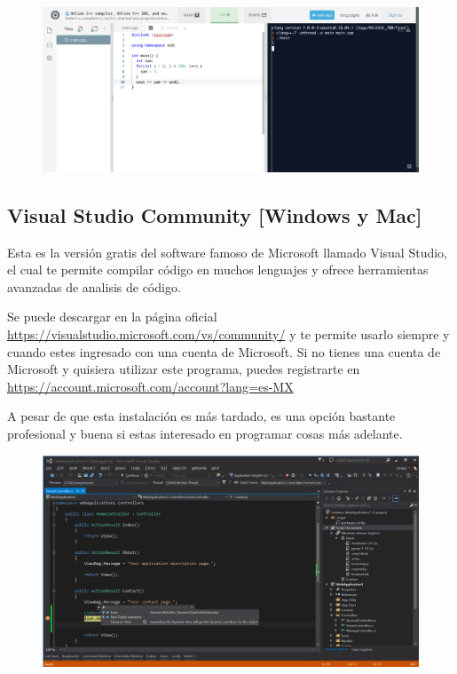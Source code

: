 \documentclass{article}
\begin{document}
\begin{figure}[H]
    \centering
    \includegraphics[width=0.5\paperwidth]{replit}
\end{figure}

\subsection{Visual Studio Community [Windows y Mac]}
Esta es la versión gratis del software famoso de Microsoft llamado Visual Studio, el cual te permite compilar código en muchos lenguajes y ofrece herramientas avanzadas de analisis de código.

Se puede descargar en la página oficial \url{https://visualstudio.microsoft.com/vs/community/} y te permite usarlo siempre y cuando estes ingresado con una cuenta de Microsoft. Si no tienes una cuenta de Microsoft y quisiera utilizar este programa, puedes registrarte en \url{https://account.microsoft.com/account?lang=es-MX}

A pesar de que esta instalación es más tardado, es una opción bastante profesional y buena si estas interesado en programar cosas más adelante.

\begin{figure}[H]
    \centering
    \includegraphics[width=0.5\paperwidth]{vscommunity}
\end{figure}
\end{document}
